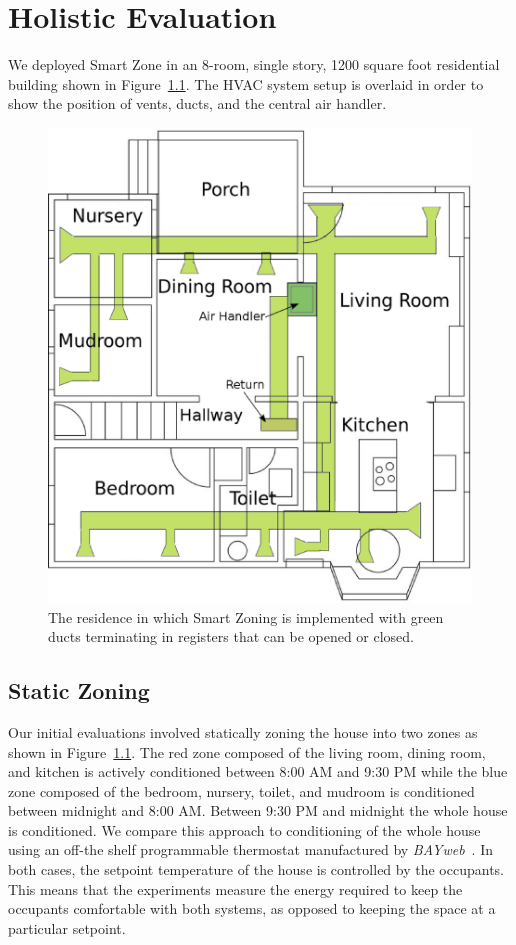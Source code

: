 \chapter{Holistic Evaluation}

We deployed Smart Zone in an 8-room, single story, 1200 square foot residential
building shown in Figure~\ref{fig:floorplan}. The HVAC system setup is overlaid
in order to show the position of vents, ducts, and the central air handler.

\begin{figure}[ht]
  \centering
  \includegraphics[width=0.6\columnwidth]{fig/floorplan-mechanical.eps}
  \caption[The Residence in which Smart Zone is Evaluated]{The residence in
    which Smart Zoning is implemented with green ducts terminating in
    registers that can be opened or closed.}
  \label{fig:floorplan}
\end{figure}

\section{Static Zoning}
Our initial evaluations involved statically zoning the house into two zones as
shown in Figure~\ref{fig:floorplan}. The red zone composed of the living room,
dining room, and kitchen is actively conditioned between 8:00 AM and 9:30 PM
while the blue zone composed of the bedroom, nursery, toilet, and mudroom is
conditioned between midnight and 8:00 AM. Between 9:30 PM and midnight the whole
house is conditioned.  We compare this approach to conditioning of the whole
house using an off-the shelf programmable thermostat manufactured by {\em
  BAYweb}~\cite{bayweb}.  In both cases, the setpoint temperature of the house
is controlled by the occupants. This means that the experiments measure the
energy required to keep the occupants comfortable with both systems, as opposed
to keeping the space at a particular setpoint.

